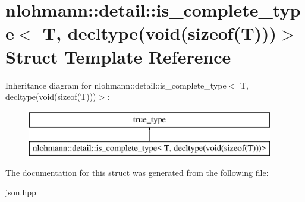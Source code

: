 \hypertarget{structnlohmann_1_1detail_1_1is__complete__type_3_01T_00_01decltype_07void_07sizeof_07T_08_08_08_4}{}\section{nlohmann\+:\+:detail\+:\+:is\+\_\+complete\+\_\+type$<$ T, decltype(void(sizeof(T)))$>$ Struct Template Reference}
\label{structnlohmann_1_1detail_1_1is__complete__type_3_01T_00_01decltype_07void_07sizeof_07T_08_08_08_4}
Inheritance diagram for nlohmann\+:\+:detail\+:\+:is\+\_\+complete\+\_\+type$<$ T, decltype(void(sizeof(T)))$>$\+:\begin{figure}[H]
\begin{center}
\leavevmode
\includegraphics[height=2.000000cm]{structnlohmann_1_1detail_1_1is__complete__type_3_01T_00_01decltype_07void_07sizeof_07T_08_08_08_4}
\end{center}
\end{figure}


The documentation for this struct was generated from the following file\+:\begin{DoxyCompactItemize}
\item 
json.\+hpp\end{DoxyCompactItemize}
